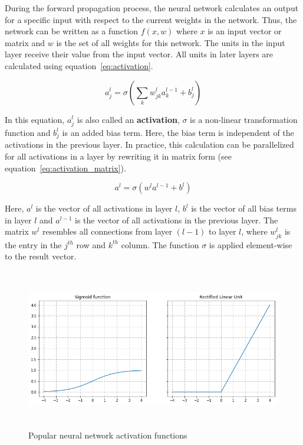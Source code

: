 During the forward propagation process, the neural network calculates an output
for a specific input with respect to the current weights in the network.
Thus, the network can be written as a function $f(x,w)$ where $x$ is an input
vector or matrix and $w$ is the set of all weights for this network.
The units in the input layer receive their value from the input vector.
All units in later layers are calculated using equation~\ref{eq:activation}.

\begin{equation}
  \label{eq:activation}
  a_j^l = \sigma(\sum_k w_{jk}^l a_k^{l-1} + b_j^l)
\end{equation}

In this equation, $a_j^l$ is also called an \textbf{activation}, $\sigma$ is a
non-linear transformation function and $b_j^l$ is an added bias term.
Here, the bias term is independent of the activations in the previous layer.
In practice, this calculation can be parallelized for all activations in a layer
by rewriting it in matrix form (see equation~\ref{eq:activation_matrix}).

\begin{equation}
  \label{eq:activation_matrix}
  a^l = \sigma(w^l a^{l-1} + b^l)
\end{equation}

Here, $a^l$ is the vector of all activations in layer $l$, $b^l$ is the vector
of all bias terms in layer $l$ and $a^{l-1}$ is the vector of all activations
in the previous layer. The matrix $w^l$ resembles all connections from layer $(l-1)$
to layer $l$, where $w^l_{jk}$ is the entry in the $j^{th}$ row and $k^{th}$ column.
The function $\sigma$ is applied element-wise to the result vector.

\begin{figure}[h]
  \includegraphics[height=7cm]{img/nn_activations}
  \caption{Popular neural network activation functions}
\label{fig:activations}
\end{figure}

